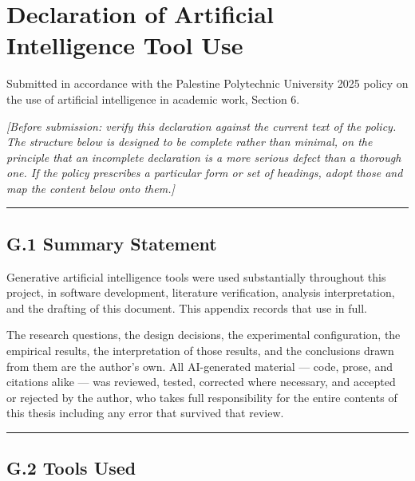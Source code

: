 \hypertarget{declaration-of-artificial-intelligence-tool-use}{%
\chapter{Declaration of Artificial Intelligence Tool Use}\label{declaration-of-artificial-intelligence-tool-use}}

Submitted in accordance with the Palestine Polytechnic University 2025 policy on the use of artificial intelligence in academic work, Section 6.

\emph{{[}Before submission: verify this declaration against the current text of the policy. The structure below is designed to be complete rather than minimal, on the principle that an incomplete declaration is a more serious defect than a thorough one. If the policy prescribes a particular form or set of headings, adopt those and map the content below onto them.{]}}

\begin{center}\rule{0.5\linewidth}{0.5pt}\end{center}

\hypertarget{g.1-summary-statement}{%
\section{G.1 Summary Statement}\label{g.1-summary-statement}}

Generative artificial intelligence tools were used substantially throughout this project, in software development, literature verification, analysis interpretation, and the drafting of this document. This appendix records that use in full.

The research questions, the design decisions, the experimental configuration, the empirical results, the interpretation of those results, and the conclusions drawn from them are the author's own. All AI-generated material --- code, prose, and citations alike --- was reviewed, tested, corrected where necessary, and accepted or rejected by the author, who takes full responsibility for the entire contents of this thesis including any error that survived that review.

\begin{center}\rule{0.5\linewidth}{0.5pt}\end{center}

\hypertarget{g.2-tools-used}{%
\section{G.2 Tools Used}\label{g.2-tools-used}}

